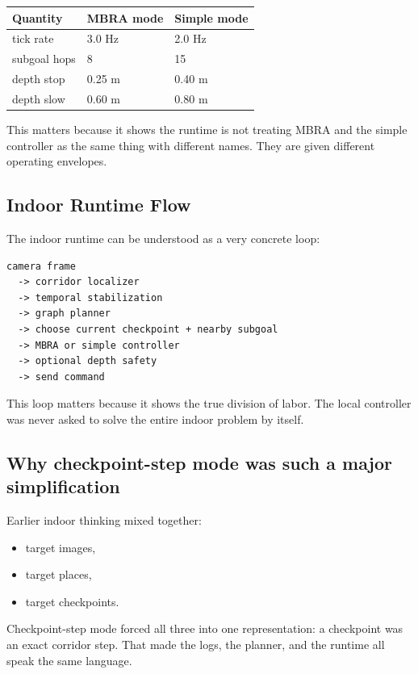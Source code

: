 \documentclass[11pt]{article}
\begin{document}
\begin{center}
\begin{tabular}{lll}
\toprule
\textbf{Quantity} & \textbf{MBRA mode} & \textbf{Simple mode} \\
\midrule
tick rate & 3.0 Hz & 2.0 Hz \\
subgoal hops & 8 & 15 \\
depth stop & 0.25 m & 0.40 m \\
depth slow & 0.60 m & 0.80 m \\
\bottomrule
\end{tabular}
\end{center}

This matters because it shows the runtime is not treating MBRA and the simple
controller as the same thing with different names. They are given different
operating envelopes.

\subsection{Indoor Runtime Flow}

The indoor runtime can be understood as a very concrete loop:

\begin{verbatim}
camera frame
  -> corridor localizer
  -> temporal stabilization
  -> graph planner
  -> choose current checkpoint + nearby subgoal
  -> MBRA or simple controller
  -> optional depth safety
  -> send command
\end{verbatim}

This loop matters because it shows the true division of labor. The local controller
was never asked to solve the entire indoor problem by itself.

\subsection{Why checkpoint-step mode was such a major simplification}

Earlier indoor thinking mixed together:

\begin{itemize}[nosep]
  \item target images,
  \item target places,
  \item target checkpoints.
\end{itemize}

Checkpoint-step mode forced all three into one representation: a checkpoint was an
exact corridor step. That made the logs, the planner, and the runtime all speak
the same language.
\end{document}
